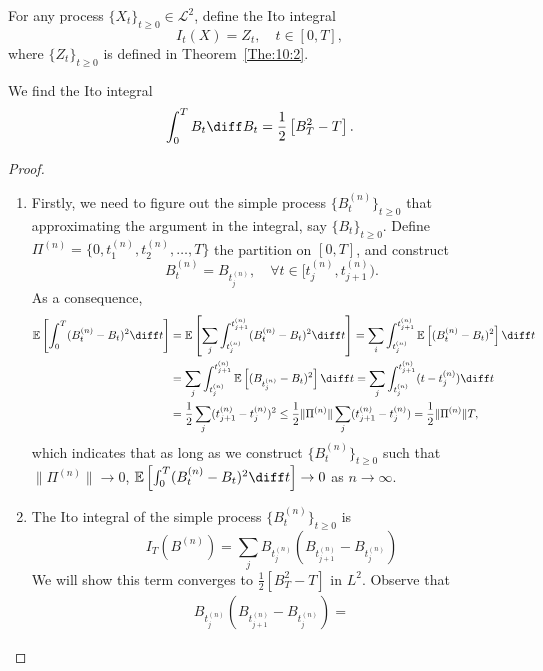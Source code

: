 \begin{definition}
For any process $\{X_t\}_{t\ge0}\in\mathcal{L}^2$, define the Ito integral
\begin{equation}
I_t(X)=Z_t,\quad t\in[0,T],
\end{equation}
where $\{Z_t\}_{t\ge0}$ is defined in Theorem~\ref{The:10:2}.
\end{definition}

\begin{proposition}
We find the Ito integral
\[
\int_0^TB_t\diff B_t=\frac{1}{2}\left[
B_T^2-T
\right].
\]
\end{proposition}
\begin{proof}
\begin{enumerate}
Before the computation, we need to show $\{B_t\}_{t\ge0}$ satisfies the assumption for Ito integral, i.e., $\{B_t\}_{t\ge0}\in\mathcal{L}^2$, which is trivial.
\item
Firstly, we need to figure out the simple process $\{B_t^{(n)}\}_{t\ge0}$ that approximating the argument in the integral, say $\{B_t\}_{t\ge0}$.
Define $\Pi^{(n)}=\{0,t_1^{(n)},t_2^{(n)},\ldots,T\}$ the partition on $[0,T]$, and  construct
\[
B_t^{(n)}=B_{t_j^{(n)}},\quad\forall t\in[t_j^{(n)},t_{j+1}^{(n)}).
\]
As a consequence,
\begin{align*}
\mathbb{E}\left[
\int_0^T(B_t^{(n)}-B_t)^2\diff t
\right]&=
\mathbb{E}\left[\sum_j
\int_{t_j^{(n)}}^{t_{j+1}^{(n)}}(B_t^{(n)}-B_t)^2\diff t
\right]=\sum_i\int_{t_j^{(n)}}^{t_{j+1}^{(n)}}\mathbb{E}\left[
(B_t^{(n)}-B_t)^2
\right]\diff t\\
&=\sum_j\int_{t_j^{(n)}}^{t_{j+1}^{(n)}}\mathbb{E}\left[
(B_{t_j^{(n)}}-B_t)^2
\right]\diff t=\sum_j\int_{t_j^{(n)}}^{t_{j+1}^{(n)}}(t-t_j^{(n)})\diff t\\
&=\frac{1}{2}\sum_j(t_{j+1}^{(n)}-t_j^{(n)})^2\le \frac{1}{2}\|\Pi^{(n)}\|\sum_j(t_{j+1}^{(n)}-t_j^{(n)})
=\frac{1}{2}\|\Pi^{(n)}\| T,
\end{align*}
which indicates that as long as we construct $\{B_t^{(n)}\}_{t\ge0}$ such that $\|\Pi^{(n)}\|\to0$, 
$\mathbb{E}\left[
\int_0^T(B_t^{(n)}-B_t)^2\diff t
\right]\to0$ as $n\to\infty$.
\item
The Ito integral of the simple process $\{B_t^{(n)}\}_{t\ge0}$ is 
\[
I_T(B^{(n)})=\sum_jB_{t_j^{(n)}}(B_{t_{j+1}^{(n)}}-B_{t_j^{(n)}})
\]
We will show this term converges to $\frac{1}{2}[B_T^2-T]$ in $L^2$.
Observe that
\begin{align*}
B_{t_j^{(n)}}(B_{t_{j+1}^{(n)}}-B_{t_j^{(n)}})=

\end{align*}
\end{enumerate}
\end{proof}
